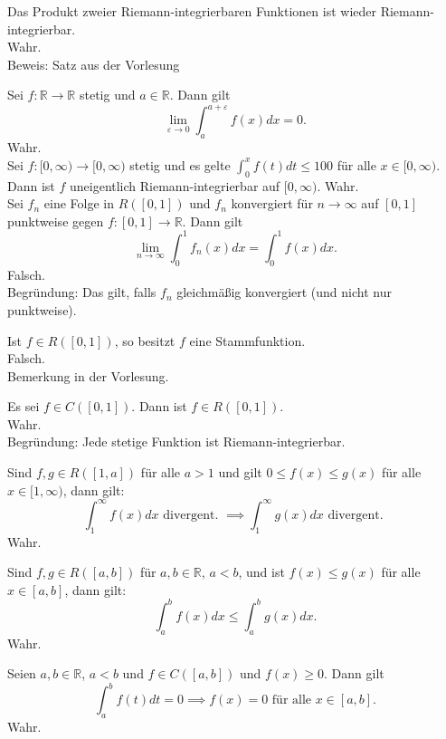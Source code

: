 \documentclass[parskip=full]{scrartcl}
\begin{document}
Das Produkt zweier Riemann-integrierbaren Funktionen ist wieder Riemann-integrierbar.\\
Wahr.\\
Beweis: Satz aus der Vorlesung

Sei $f: \mathbb{R} \to \mathbb{R}$ stetig und $a \in \mathbb{R}$.
Dann gilt
\begin{displaymath}
  \lim_{\varepsilon \to 0} \int_{a}^{a + \varepsilon} f(x)dx = 0.
\end{displaymath}
Wahr.\\

Sei $f : [0, \infty)\to [0,\infty)$ stetig und es gelte $\int_{0}^{x} f(t)dt \leq 100$ für alle $x \in [0, \infty)$.
Dann ist $f$ uneigentlich Riemann-integrierbar auf $[0,\infty)$.
Wahr.\\

Sei $f_n$ eine Folge in $R([0,1])$ und $f_n$ konvergiert für $n \to \infty$ auf $[0,1]$ punktweise gegen $f: [0,1] \to \mathbb{R}$.
Dann gilt
\begin{displaymath}
  \lim_{n \to \infty} \int_{0}^{1} f_n(x)dx = \int_{0}^{1} f(x)dx.
\end{displaymath}
Falsch.\\
Begründung: Das gilt, falls $f_n$ gleichmäßig konvergiert (und nicht nur punktweise).

Ist $f \in R([0,1])$, so besitzt $f$ eine Stammfunktion.\\
Falsch.\\
Bemerkung in der Vorlesung.

Es sei $f \in C([0,1])$.
Dann ist $f \in R([0,1])$.\\
Wahr.\\
Begründung: Jede stetige Funktion ist Riemann-integrierbar.

Sind $f,g \in R([1,a])$ für alle $a > 1$ und gilt $0 \leq f(x) \leq g(x)$ für alle $x \in [1,\infty)$, dann gilt:
\begin{displaymath}
  \int_{1}^{\infty} f(x) dx \text{ divergent. } \implies \int_{1}^{\infty} g(x) dx \text{ divergent. }
\end{displaymath}
Wahr.

Sind $f,g \in R([a,b])$ für $a,b \in \mathbb{R}$, $a < b$, und ist $f(x) \leq g(x)$ für alle $x \in [a,b]$, dann gilt:
\begin{displaymath}
  \int_{a}^{b} f(x) dx \leq \int_{a}^{b} g(x) dx.
\end{displaymath}
Wahr.

Seien $a,b \in \mathbb{R}$, $a < b$ und $f \in C([a,b])$ und $f(x) \geq 0$.
Dann gilt
\begin{displaymath}
  \int_{a}^{b} f(t) dt = 0 \implies f(x) = 0 \text{ für alle } x \in [a,b].
\end{displaymath}
Wahr.
\end{document}
